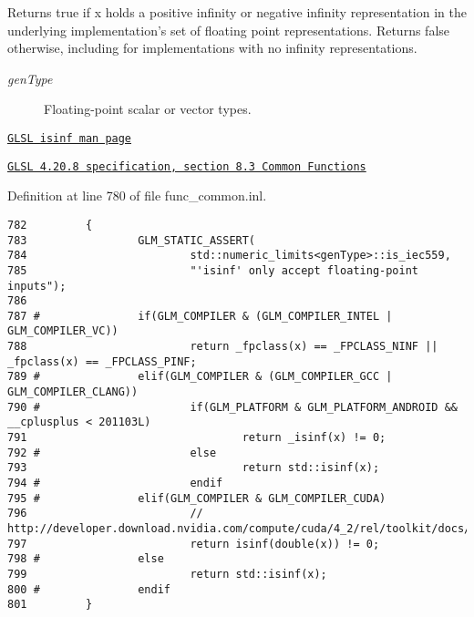 Returns true if x holds a positive infinity or negative infinity representation in the underlying implementation's set of floating point representations. Returns false otherwise, including for implementations with no infinity representations.

\begin{Desc}
\item[Template Parameters:]
\begin{description}
\item[{\em genType}]Floating-point scalar or vector types.\end{description}
\end{Desc}
\begin{Desc}
\item[See also:]\href{http://www.opengl.org/sdk/docs/manglsl/xhtml/isinf.xml}{\tt GLSL isinf man page} 

\href{http://www.opengl.org/registry/doc/GLSLangSpec.4.20.8.pdf}{\tt GLSL 4.20.8 specification, section 8.3 Common Functions} \end{Desc}


Definition at line 780 of file func\_\-common.inl.

\begin{Code}\begin{verbatim}782         {
783                 GLM_STATIC_ASSERT(
784                         std::numeric_limits<genType>::is_iec559,
785                         "'isinf' only accept floating-point inputs");
786 
787 #               if(GLM_COMPILER & (GLM_COMPILER_INTEL | GLM_COMPILER_VC))
788                         return _fpclass(x) == _FPCLASS_NINF || _fpclass(x) == _FPCLASS_PINF;
789 #               elif(GLM_COMPILER & (GLM_COMPILER_GCC | GLM_COMPILER_CLANG))
790 #                       if(GLM_PLATFORM & GLM_PLATFORM_ANDROID && __cplusplus < 201103L)
791                                 return _isinf(x) != 0;
792 #                       else
793                                 return std::isinf(x);
794 #                       endif
795 #               elif(GLM_COMPILER & GLM_COMPILER_CUDA)
796                         // http://developer.download.nvidia.com/compute/cuda/4_2/rel/toolkit/docs/online/group__CUDA__MATH__DOUBLE_g13431dd2b40b51f9139cbb7f50c18fab.html#g13431dd2b40b51f9139cbb7f50c18fab
797                         return isinf(double(x)) != 0;
798 #               else
799                         return std::isinf(x);
800 #               endif
801         }
\end{verbatim}
\end{Code}


